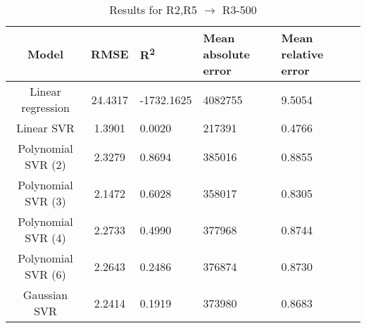 \begin{table}[H]
\centering
\begin{adjustbox}{center}
\begin{tabular}{c | c M{1.2cm} M{2.5cm} M{2.5cm} M{1.8cm}}
Model & RMSE & R\textsuperscript{2} & Mean absolute error & Mean relative error \tabularnewline
\hline
Linear regression & 24.4317 & -1732.1625 & 4082755 & 9.5054 \\
Linear SVR & 1.3901 & 0.0020 & 217391 & 0.4766 \\
Polynomial SVR (2) & 2.3279 & 0.8694 & 385016 & 0.8855 \\
Polynomial SVR (3) & 2.1472 & 0.6028 & 358017 & 0.8305 \\
Polynomial SVR (4) & 2.2733 & 0.4990 & 377968 & 0.8744 \\
Polynomial SVR (6) & 2.2643 & 0.2486 & 376874 & 0.8730 \\
Gaussian SVR & 2.2414 & 0.1919 & 373980 & 0.8683 \\
\end{tabular}
\end{adjustbox}
\\
\caption{Results for R2,R5 $\rightarrow$ R3-500}
\label{tab:coreonly_linear_R2,R5_R3_500}
\end{table}
